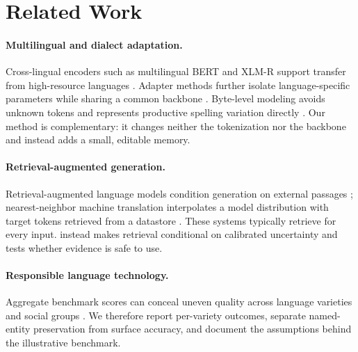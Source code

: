 \section{Related Work}
\label{sec:related}

\paragraph{Multilingual and dialect adaptation.}
Cross-lingual encoders such as multilingual BERT and XLM-R support transfer
from high-resource languages \citep{devlin2019bert,conneau2020xlmr}. Adapter
methods further isolate language-specific parameters while sharing a common
backbone \citep{pfeiffer2020madx}. Byte-level modeling avoids unknown tokens
and represents productive spelling variation directly
\citep{xue2022byt5}. Our method is complementary: it changes neither the
tokenization nor the backbone and instead adds a small, editable memory.

\paragraph{Retrieval-augmented generation.}
Retrieval-augmented language models condition generation on external passages
\citep{lewis2020rag}; nearest-neighbor machine translation interpolates a
model distribution with target tokens retrieved from a datastore
\citep{khandelwal2021knnmt}. These systems typically retrieve for every input.
\method instead makes retrieval conditional on calibrated uncertainty and
tests whether evidence is safe to use.

\paragraph{Responsible language technology.}
Aggregate benchmark scores can conceal uneven quality across language
varieties and social groups \citep{blodgett2020language}. We therefore report
per-variety outcomes, separate named-entity preservation from surface
accuracy, and document the assumptions behind the illustrative benchmark.

